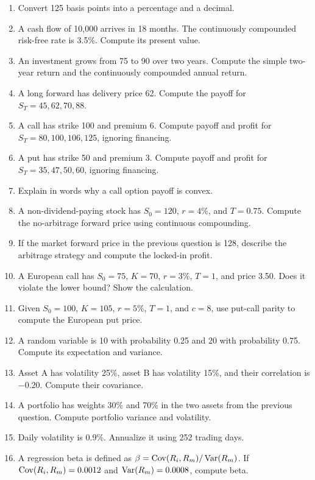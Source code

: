 \begin{enumerate}
    \item Convert 125 basis points into a percentage and a decimal.
    \item A cash flow of 10,000 arrives in 18 months. The continuously compounded
    risk-free rate is 3.5\%. Compute its present value.
    \item An investment grows from 75 to 90 over two years. Compute the simple
    two-year return and the continuously compounded annual return.
    \item A long forward has delivery price 62. Compute the payoff for
    $S_T=45,62,70,88$.
    \item A call has strike 100 and premium 6. Compute payoff and profit for
    $S_T=80,100,106,125$, ignoring financing.
    \item A put has strike 50 and premium 3. Compute payoff and profit for
    $S_T=35,47,50,60$, ignoring financing.
    \item Explain in words why a call option payoff is convex.
    \item A non-dividend-paying stock has $S_0=120$, $r=4\%$, and $T=0.75$.
    Compute the no-arbitrage forward price using continuous compounding.
    \item If the market forward price in the previous question is 128, describe
    the arbitrage strategy and compute the locked-in profit.
    \item A European call has $S_0=75$, $K=70$, $r=3\%$, $T=1$, and price 3.50.
    Does it violate the lower bound? Show the calculation.
    \item Given $S_0=100$, $K=105$, $r=5\%$, $T=1$, and $c=8$, use put-call
    parity to compute the European put price.
    \item A random variable is 10 with probability 0.25 and 20 with probability
    0.75. Compute its expectation and variance.
    \item Asset A has volatility 25\%, asset B has volatility 15\%, and their
    correlation is $-0.20$. Compute their covariance.
    \item A portfolio has weights 30\% and 70\% in the two assets from the
    previous question. Compute portfolio variance and volatility.
    \item Daily volatility is 0.9\%. Annualize it using 252 trading days.
    \item A regression beta is defined as
    $\beta=\operatorname{Cov}(R_i,R_m)/\operatorname{Var}(R_m)$. If $\operatorname{Cov}(R_i,R_m)=0.0012$ and
    $\operatorname{Var}(R_m)=0.0008$, compute beta.

\end{enumerate}
